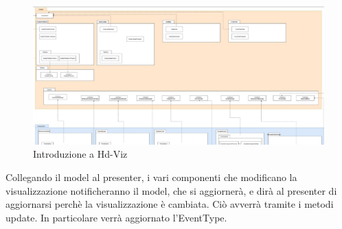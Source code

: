 \documentclass[../manuale_sviluppatore.tex]{subfiles}
\begin{document}
\begin{figure}[H]
	\centering
	\includegraphics[width=18cm]{img/graphs-e-components.jpg}
	\caption{Introduzione a Hd-Viz}
\end{figure}


Collegando il model al presenter, i vari componenti che modificano la visualizzazione notificheranno il model, che si aggiornerà, e dirà al presenter di aggiornarsi perchè la visualizzazione è cambiata. 
Ciò avverrà tramite i metodi update. In particolare verrà aggiornato l'EventType.
\end{document}
